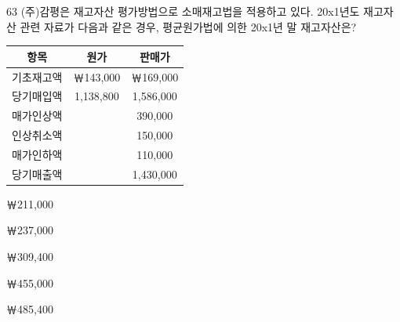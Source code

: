 \begin{question}{63}
(주)감평은 재고자산 평가방법으로 소매재고법을 적용하고 있다. 20x1년도 재고자산 관련 자료가 다음과 같은 경우, 평균원가법에 의한 20x1년 말 재고자산은? \par
{\small\centering
\begin{tabular}{|c|c|c|}
\hline
항목 & 원가 & 판매가 \\
\hline
기초재고액 & ￦143,000 & ￦169,000 \\
당기매입액 & 1,138,800 & 1,586,000 \\
매가인상액 & & 390,000 \\
인상취소액 & & 150,000 \\
매가인하액 & & 110,000 \\
당기매출액 & & 1,430,000 \\
\hline
\end{tabular}\par}

\begin{choices}
  \item ￦211,000
  \item ￦237,000
  \item ￦309,400
  \item ￦455,000
  \item ￦485,400
\end{choices}
\end{question}
